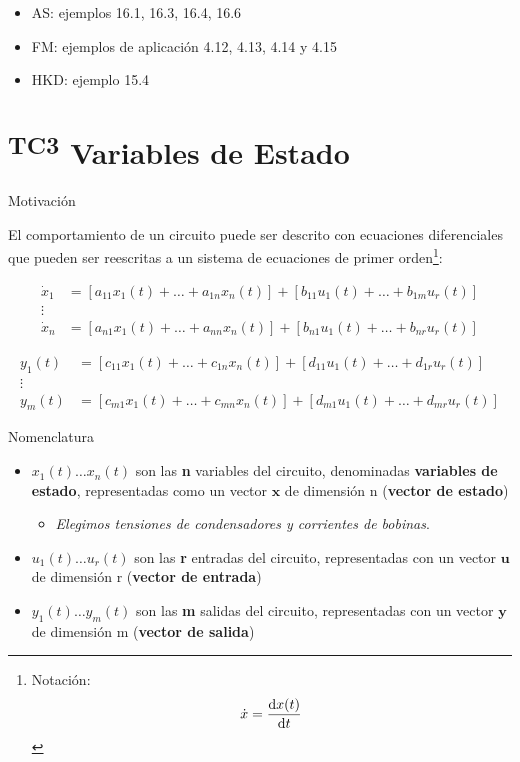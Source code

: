 \begin{itemize}
\item AS: ejemplos 16.1, 16.3, 16.4, 16.6
\item FM: ejemplos de aplicación 4.12, 4.13, 4.14 y 4.15
\item HKD: ejemplo 15.4
\end{itemize}

\section{\textsuperscript{TC3} Variables de Estado}

{Motivación}

El comportamiento de un circuito puede ser descrito con ecuaciones diferenciales que pueden ser reescritas a un sistema de ecuaciones de primer orden\footnote{Notación: \[\dot{x} = \diff{x(t)}{t}\]}:

\begin{align*}
  \dot{x}_1 &= \left[a_{11} x_1(t) + \dots + a_{1n} x_n(t)\right] + \left[b_{11} u_1(t) + \dots + b_{1m}u_r(t) \right]\\
  \vdots\\
    \dot{x}_n &= \left[a_{n1} x_1(t) + \dots + a_{nn} x_n(t)\right] + \left[b_{n1} u_1(t) + \dots + b_{nr}u_r(t) \right] 
\end{align*}

\begin{align*}
  y_1(t) &= \left[c_{11} x_1(t) + \dots + c_{1n} x_n(t)\right] + \left[d_{11} u_1(t) + \dots + d_{1r}u_r(t) \right]\\
  \vdots\\
    y_m(t) &= \left[c_{m1} x_1(t) + \dots + c_{mn} x_n(t)\right] + \left[d_{m1} u_1(t) + \dots + d_{mr}u_r(t) \right] 
\end{align*}

{Nomenclatura}

\begin{itemize}
\item \(x_1(t) \dots x_n(t)\) son las \textbf{n} variables del circuito, denominadas \textbf{variables de estado}, representadas como un vector \(\mathbf{x}\) de dimensión n (\textbf{vector de estado})
\begin{itemize}
\item \emph{Elegimos tensiones de condensadores y corrientes de bobinas}.
\end{itemize}
\end{itemize}
\begin{itemize}
\item \(u_1(t) \dots u_r(t)\) son las \textbf{r} entradas del circuito, representadas con un vector \(\mathbf{u}\) de dimensión r (\textbf{vector de entrada})
\end{itemize}
\begin{itemize}
\item \(y_1(t) \dots y_m(t)\) son las \textbf{m} salidas del circuito, representadas con un vector \(\mathbf{y}\) de dimensión m (\textbf{vector de salida})
\end{itemize}


